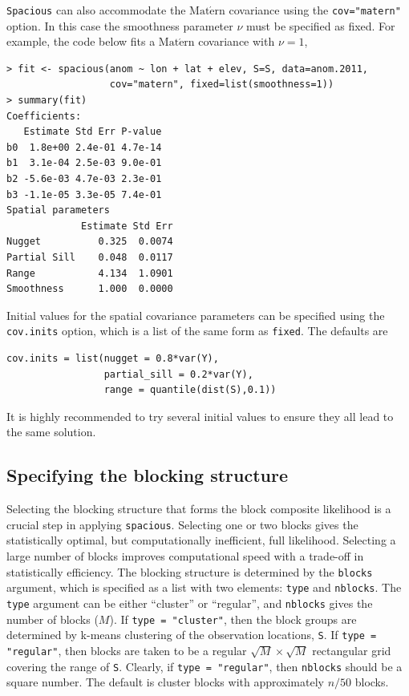 \documentclass[11pt]{article}
\newcommand{\Matern}{ \mbox{Mat$\acute{\mbox{e}}$rn}}
\begin{document}
{\tt Spacious} can also accommodate the $\Matern$ covariance using the {\tt cov="matern"} option.
In this case the smoothness parameter $\nu$ must be specified as fixed.
For example, the code below fits a $\Matern$ covariance with $\nu=1$,

\begin{verbatim}
> fit <- spacious(anom ~ lon + lat + elev, S=S, data=anom.2011,
                  cov="matern", fixed=list(smoothness=1))
> summary(fit)
Coefficients:
   Estimate Std Err P-value
b0  1.8e+00 2.4e-01 4.7e-14
b1  3.1e-04 2.5e-03 9.0e-01
b2 -5.6e-03 4.7e-03 2.3e-01
b3 -1.1e-05 3.3e-05 7.4e-01
Spatial parameters
             Estimate Std Err
Nugget          0.325  0.0074
Partial Sill    0.048  0.0117
Range           4.134  1.0901
Smoothness      1.000  0.0000
\end{verbatim}

Initial values for the spatial covariance parameters can be specified using the {\tt cov.inits} option, which is a list of the same form as {\tt fixed}.   The defaults are
\begin{verbatim}
cov.inits = list(nugget = 0.8*var(Y),
                 partial_sill = 0.2*var(Y),
                 range = quantile(dist(S),0.1))
\end{verbatim}
It is highly recommended to try several initial values to ensure they all lead to the same solution.

\subsection{Specifying the blocking structure}

Selecting the blocking structure that forms the block composite likelihood is a crucial step in applying {\tt spacious}.
Selecting one or two blocks gives the statistically optimal, but computationally inefficient, full likelihood.
Selecting a large number of blocks improves computational speed with a trade-off in statistically efficiency.
The blocking structure is determined by the {\tt blocks} argument, which is specified as a list with two elements: {\tt type} and {\tt nblocks}.
The {\tt type} argument can be either ``cluster'' or ``regular'', and {\tt nblocks} gives the number of blocks ($M$).
If {\tt type = "cluster"}, then the block groups are determined by k-means clustering of the observation locations, {\tt S}.
If {\tt type = "regular"}, then blocks are taken to be a regular $\sqrt{M}\times\sqrt{M}$ rectangular grid covering the range of {\tt S}.
Clearly, if {\tt type = "regular"}, then {\tt nblocks} should be a square number.
The default is cluster blocks with approximately $n/50$ blocks.
\end{document}
